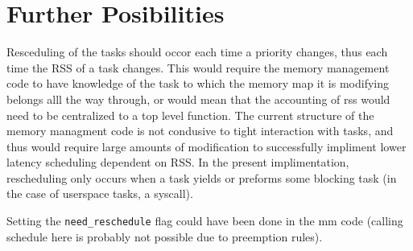 \documentclass[10pt]{article}
\begin{document}
\section{Further Posibilities}

Resceduling of the tasks should occor each time a priority changes, thus
each time the RSS of a task changes. This would require the memory
management code to have knowledge of the task to which the memory map it
is modifying belongs alll the way through, or would mean that the
accounting of rss would need to be centralized to a top level function.
The current structure of the memory managment code is not condusive to
tight interaction with tasks, and thus would require large amounts of
modification to successfully impliment lower latency scheduling dependent
on RSS. In the present implimentation, rescheduling only occurs when a
task yields or preforms some blocking task (in the case of userspace
tasks, a syscall).

Setting the \texttt{need\_reschedule} flag could have been done in the mm
code (calling schedule here is probably not possible due to preemption
rules).
\end{document}

